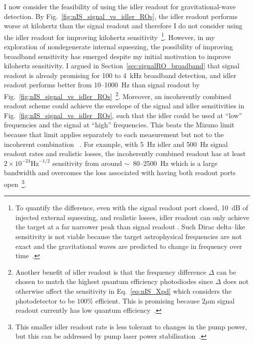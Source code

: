 I now consider the feasibility of using the idler readout for gravitational-wave detection. By Fig.~\ref{fig:nIS_signal_vs_idler_ROs}, the idler readout performs worse at kilohertz than the signal readout  and therefore I do not consider using the idler readout for improving kilohertz sensitivity~\footnote{To quantify the difference, even with the signal readout port closed, 10~dB of injected external squeezing, and realistic losses, idler readout can only achieve the target at a far narrower peak than signal readout . Such Dirac delta--like sensitivity is not viable because the target astrophysical frequencies are not exact and the gravitational waves are predicted to change in frequency over time~\cite{}.}.
However, in my exploration of nondegenerate internal squeezing, the possibility of improving broadband sensitivity has emerged despite my initial motivation to improve kilohertz sensitivity. I argued in Section~\ref{sec:signalRO_broadband} that signal readout is already promising for 100 to 4~kHz broadband detection, and idler readout performs better from 10--1000~Hz than signal readout by Fig.~\ref{fig:nIS_signal_vs_idler_ROs}~\footnote{Another benefit of idler readout is that the frequency difference $\Delta$ can be chosen to match the highest quantum efficiency photodiodes since $\Delta$ does not otherwise affect the sensitivity in Eq.~\ref{eq:nIS_Xpd} which considers the photodetector to be $100\%$ efficient. This is promising because $2 \mu\text{m}$ signal readout currently has low quantum efficiency~\cite{}. }. %
Moreover, an incoherently combined readout scheme could achieve the envelope of the signal and idler sensitivities in Fig.~\ref{fig:nIS_signal_vs_idler_ROs}, such that the idler could be used at ``low'' frequencies and the signal at ``high'' frequencies. This beats the Mizuno limit because that limit applies separately to each measurement but not to the incoherent combination ~\cite{}.
For example, with 5~Hz idler and 500~Hz signal readout rates and realistic losses, the incoherently combined readout has at least $2\times10^{-24}\text{Hz}^{-1/2}$ sensitivity from around $\sim$~80--2500~Hz  which is a large bandwidth  and overcomes the loss associated with having both readout ports open~\footnote{This smaller idler readout rate is less tolerant to changes in the pump power, but this can be addressed by pump laser power stabilisation~\cite{}.}.
